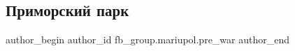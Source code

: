  
 
 
 
 

\subsection{Приморский парк}
\label{sec:25_02_2023.fb.fb_group.mariupol.pre_war.2.primorskii_park}

\ifcmt
 author_begin
   author_id fb_group.mariupol.pre_war
 author_end
\fi
